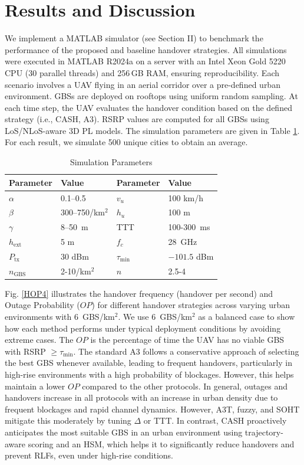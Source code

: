 \documentclass[10pt,conference]{IEEEtran}
\begin{document}
\section{Results and Discussion}
We implement a MATLAB simulator (see Section II) to benchmark the performance of the proposed and baseline handover strategies. All simulations were executed in MATLAB R2024a on a server with an Intel Xeon Gold 5220 CPU (30 parallel threads) and 256\,GB RAM, ensuring reproducibility. Each scenario involves a UAV flying in an aerial corridor over a pre-defined urban environment. GBSs are deployed on rooftops using uniform random sampling. At each time step, the UAV evaluates the handover condition based on the defined strategy (i.e., CASH, A3). RSRP values are computed for all GBSs using LoS/NLoS-aware 3D PL models. The simulation parameters are given in Table \ref{simparams}. For each result, we simulate 500 unique cities to obtain an average.


\begin{table}[t]
\caption{Simulation Parameters}
\centering
\begin{tabular}{|p{1.5cm}|p{1.5cm}|p{2cm}|p{2cm}|}
\hline
\textbf{Parameter} & \textbf{Value} & \textbf{Parameter} & \textbf{Value} \\
\hline
$\alpha$ & 0.1–0.5 & $v_u$ & 100 km/h \\ \hline
$\beta$ & 300–750/km$^2$ & $h_u$ & 100 m \\ \hline
$\gamma$ & 8–50~m & TTT & 100-300~ms \\ \hline
$h_{\text{ext}}$ & 5 m & $f_c$ & 28~GHz \\ \hline
$P_{\mathrm{tx}}$ & 30 dBm & $\tau_{\min}$ & $-101.5$ dBm \\ \hline
$n_{\text{GBS}}$ & 2-10/km$^2$ & $n$ & 2.5-4 \\ \hline
\end{tabular}
\label{simparams}
\end{table}

Fig. \ref{HOP4} illustrates the handover frequency (handover per second) and Outage Probability ($OP$) for different handover strategies across varying urban environments with 6~GBS/km$^2$. We use 6~GBS/km$^2$ as a balanced case to show how each method performs under typical deployment conditions by avoiding extreme cases.  The $OP$ is the percentage of time the UAV has no viable GBS with RSRP $\geq \tau_{\min}$. The standard A3 follows a conservative approach of selecting the best GBS whenever available, leading to frequent handovers, particularly in high-rise environments with a high probability of blockages. However, this helps maintain a lower $OP$ compared to the other protocols. In general, outages and handovers increase in all protocols with an increase in urban density due to frequent blockages and rapid channel dynamics. However, A3T, fuzzy, and SOHT mitigate this moderately by tuning $\Delta$ or TTT. In contrast, CASH proactively anticipates the most suitable GBS in an urban environment using trajectory-aware scoring and an HSM, which helps it to significantly reduce handovers and prevent RLFs, even under high-rise conditions.
\end{document}
